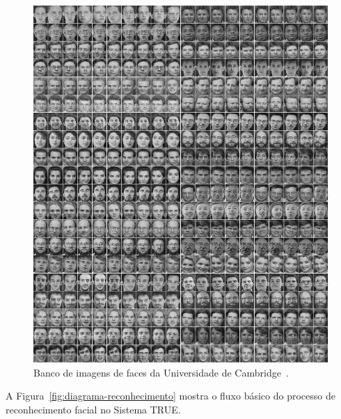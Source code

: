 		\begin{figure}[hbt]
			\begin{center}
				\includegraphics[scale=0.4]{figuras/4.ProblemaEProposta/cambrigdefacedb.png}
			\end{center}
			\caption{Banco de imagens de faces da Universidade de Cambridge~\cite{cambridgeFaceDb}.}
			\label{fig:cambridgeFaceDb}
		\end{figure}

		A Figura~\ref{fig:diagrama-reconhecimento} mostra o fluxo básico do processo de reconhecimento facial no Sistema TRUE.

